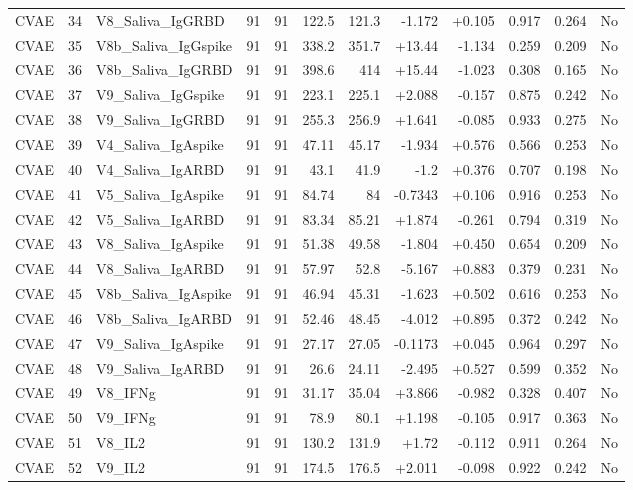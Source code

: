 \begin{landscape}
\begin{longtable}{@{}lrp{4.0cm}rrrrrrrrr@{}}
CVAE & 34 & V8\_Saliva\_IgGRBD & 91 & 91 & 122.5 & 121.3 & -1.172 & +0.105 & 0.917 & 0.264 & No \\
CVAE & 35 & V8b\_Saliva\_IgGspike & 91 & 91 & 338.2 & 351.7 & +13.44 & -1.134 & 0.259 & 0.209 & No \\
CVAE & 36 & V8b\_Saliva\_IgGRBD & 91 & 91 & 398.6 & 414 & +15.44 & -1.023 & 0.308 & 0.165 & No \\
CVAE & 37 & V9\_Saliva\_IgGspike & 91 & 91 & 223.1 & 225.1 & +2.088 & -0.157 & 0.875 & 0.242 & No \\
CVAE & 38 & V9\_Saliva\_IgGRBD & 91 & 91 & 255.3 & 256.9 & +1.641 & -0.085 & 0.933 & 0.275 & No \\
CVAE & 39 & V4\_Saliva\_IgAspike & 91 & 91 & 47.11 & 45.17 & -1.934 & +0.576 & 0.566 & 0.253 & No \\
CVAE & 40 & V4\_Saliva\_IgARBD & 91 & 91 & 43.1 & 41.9 & -1.2 & +0.376 & 0.707 & 0.198 & No \\
CVAE & 41 & V5\_Saliva\_IgAspike & 91 & 91 & 84.74 & 84 & -0.7343 & +0.106 & 0.916 & 0.253 & No \\
CVAE & 42 & V5\_Saliva\_IgARBD & 91 & 91 & 83.34 & 85.21 & +1.874 & -0.261 & 0.794 & 0.319 & No \\
CVAE & 43 & V8\_Saliva\_IgAspike & 91 & 91 & 51.38 & 49.58 & -1.804 & +0.450 & 0.654 & 0.209 & No \\
CVAE & 44 & V8\_Saliva\_IgARBD & 91 & 91 & 57.97 & 52.8 & -5.167 & +0.883 & 0.379 & 0.231 & No \\
CVAE & 45 & V8b\_Saliva\_IgAspike & 91 & 91 & 46.94 & 45.31 & -1.623 & +0.502 & 0.616 & 0.253 & No \\
CVAE & 46 & V8b\_Saliva\_IgARBD & 91 & 91 & 52.46 & 48.45 & -4.012 & +0.895 & 0.372 & 0.242 & No \\
CVAE & 47 & V9\_Saliva\_IgAspike & 91 & 91 & 27.17 & 27.05 & -0.1173 & +0.045 & 0.964 & 0.297 & No \\
CVAE & 48 & V9\_Saliva\_IgARBD & 91 & 91 & 26.6 & 24.11 & -2.495 & +0.527 & 0.599 & 0.352 & No \\
CVAE & 49 & V8\_IFNg & 91 & 91 & 31.17 & 35.04 & +3.866 & -0.982 & 0.328 & 0.407 & No \\
CVAE & 50 & V9\_IFNg & 91 & 91 & 78.9 & 80.1 & +1.198 & -0.105 & 0.917 & 0.363 & No \\
CVAE & 51 & V8\_IL2 & 91 & 91 & 130.2 & 131.9 & +1.72 & -0.112 & 0.911 & 0.264 & No \\
CVAE & 52 & V9\_IL2 & 91 & 91 & 174.5 & 176.5 & +2.011 & -0.098 & 0.922 & 0.242 & No \\

\end{longtable}
\end{landscape}
